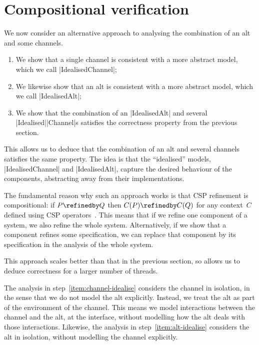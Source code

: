 \section{Compositional verification}
\label{sec:compositional}

\inlineCSP

We now consider an alternative approach to analysing the combination of an alt
and some channels.  
%
\begin{enumerate}
\item\label{item:channel-idealise}
  We show that a single channel is consistent with a more
  abstract model, which we call |IdealisedChannel|;

\item\label{item:alt-idealise}
  We likewise show that an alt  is consistent with a more
  abstract model, which we call |IdealisedAlt|;

\item We show that the combination of an |IdealisedAlt| and several
  |Idealised|\-|Channel|s satisfies the correctness property from the previous
  section.
\end{enumerate}
%
This allows us to deduce that the combination of an alt and several channels
satisfies the same property.  The idea is that the ``idealised'' models,
|IdealisedChannel| and |IdealisedAlt|, capture the desired behaviour of the
components, abstracting away from their implementations. 

The fundamental reason why such an approach works is that CSP refinement is
compositional: if $P \refinedby Q$ then $C(P) \refinedby C(Q)$ for any
context~$C$ defined using CSP operators~\cite{awr:UCS}.  This means that if we
refine one component of a system, we also refine the whole system.
Alternatively, if we show that a component refines some specification, we can
replace that component by its specification in the analysis of the whole
system. 

This approach scales better than that in the previous section, so allows us to
deduce correctness for a larger number of threads.

The analysis in step~\ref{item:channel-idealise} considers the channel in
isolation, in the sense that we do not model the alt explicitly.  Instead, we
treat the alt as part of the environment of the channel.  This means we model
interactions between the channel and the alt, at the interface, without
modelling how the alt deals with those interactions.  Likewise, the analysis
in step~\ref{item:alt-idealise} considers the alt in isolation, without
modelling the channel explicitly.

